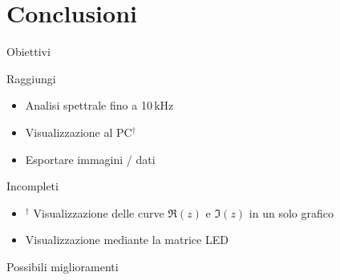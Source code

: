 \documentclass[10pt, xetex, handout]{beamer}
\begin{document}
\section{Conclusioni}
\begin{frame}{Obiettivi}
    \begin{block}{Raggiungi}
    \begin{itemize}
        \item Analisi spettrale fino a 10\,kHz
        \item Visualizzazione al PC\(^\dagger\)
        \item Esportare immagini / dati
    \end{itemize}
    \end{block}
    \pause

    \begin{block}{Incompleti}
    \begin{itemize}
        \item \(^\dagger\) Visualizzazione delle curve \(\Re(z)\) e \(\Im(z)\) in un solo grafico
        \item Visualizzazione mediante la matrice LED
    \end{itemize}
    \end{block}
\end{frame}

\begin{frame}{Possibili miglioramenti}
\end{frame}
\end{document}
